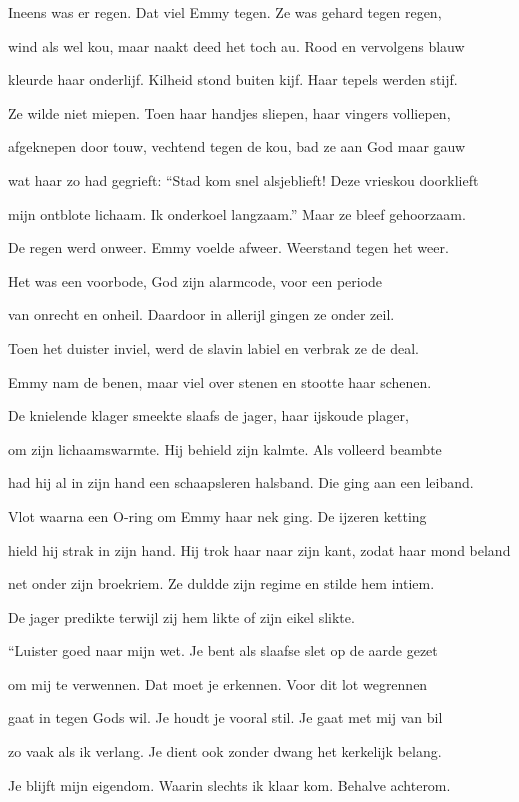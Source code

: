 Ineens was er regen.
Dat viel Emmy tegen.
Ze was gehard tegen regen,

wind als wel kou,
maar naakt deed het toch au.
Rood en vervolgens blauw

kleurde haar onderlijf.
Kilheid stond buiten kijf.
Haar tepels werden stijf.

Ze wilde niet miepen.
Toen haar handjes sliepen,
haar vingers volliepen,

afgeknepen door touw,
vechtend tegen de kou,
bad ze aan God maar gauw

wat haar zo had gegrieft:
“Stad kom snel alsjeblieft!
Deze vrieskou doorklieft

mijn ontblote lichaam.
Ik onderkoel langzaam.”
Maar ze bleef gehoorzaam.

De regen werd onweer.
Emmy voelde afweer.
Weerstand tegen het weer.

Het was een voorbode,
God zijn alarmcode,
voor een periode

van onrecht en onheil.
Daardoor in allerijl
gingen ze onder zeil.

Toen het duister inviel,
werd de slavin labiel
en verbrak ze de deal.

Emmy nam de benen,
maar viel over stenen
en stootte haar schenen.

De knielende klager
smeekte slaafs de jager,
haar ijskoude plager,

om zijn lichaamswarmte.
Hij behield zijn kalmte.
Als volleerd beambte

had hij al in zijn hand
een schaapsleren halsband.
Die ging aan een leiband.

Vlot waarna een O-ring
om Emmy haar nek ging.
De ijzeren ketting

hield hij strak in zijn hand.
Hij trok haar naar zijn kant,
zodat haar mond beland

net onder zijn broekriem.
Ze duldde zijn regime
en stilde hem intiem.

De jager predikte
terwijl zij hem likte
of zijn eikel slikte.

“Luister goed naar mijn wet.
Je bent als slaafse slet
op de aarde gezet

om mij te verwennen.
Dat moet je erkennen.
Voor dit lot wegrennen

gaat in tegen Gods wil.
Je houdt je vooral stil.
Je gaat met mij van bil

zo vaak als ik verlang.
Je dient ook zonder dwang
het kerkelijk belang.

Je blijft mijn eigendom.
Waarin slechts ik klaar kom.
Behalve achterom.

